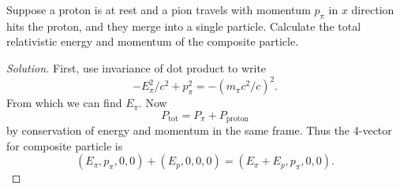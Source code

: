 \begin{example}
	Suppose a proton is at rest and a pion travels with momentum $p_\pi$ in $x$ direction hits the proton, and they merge into a single particle. Calculate the total relativistic energy and momentum of the composite particle.

\begin{proof}[Solution]
	First, use invariance of dot product to write \[
		-E_\pi^2 / c^2 + p_\pi^2 = -(m_\pi c^2 / c)^2 
	.\] 
	From which we can find $E_\pi$. Now
	\[
		P_{\text{tot}} = P_{\pi} + P_{\text{proton}}
	\] 
	by conservation of energy and momentum in the same frame. Thus the 4-vector for composite particle is
	\[
		\left( E_\pi, p_\pi, 0,0 \right) +
		\left( E_p, 0,0,0 \right) =
		\left( E_\pi + E_p, p_\pi, 0,0 \right) 
	.\] 
\end{proof}

\end{example}
